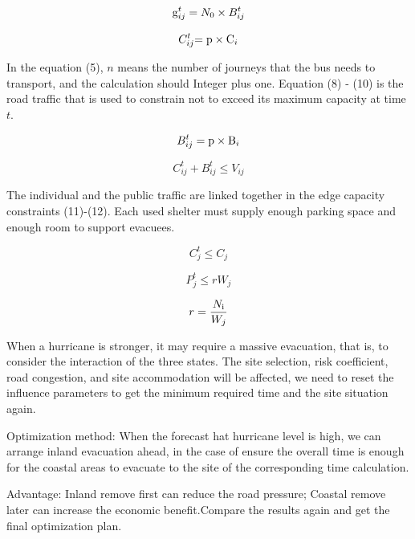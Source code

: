 \documentclass{mcmthesis}
\begin{document}
\begin{equation}\label{9}
  {\rm{g}}_{ij}^t = {N_0} \times B_{ij}^t
\end{equation}

\begin{equation}\label{10}
  C_{ij}^t{\rm{ = p}} \times {{\rm{C}}_i}
\end{equation}

In the equation (5), $n$ means the number of journeys that the bus needs to transport, and the calculation should Integer plus one. Equation (8) - (10) is the road traffic that is used to constrain not to exceed its maximum capacity at time $t$.

\begin{equation}\label{11}
  B_{ij}^t = {\rm{p}} \times {{\rm{B}}_i}
\end{equation}

\begin{equation}\label{12}
  C_{ij}^t + B_{ij}^t \le {V_{ij}}
\end{equation}

The individual and the public traffic are linked together in the edge capacity constraints (11)-(12). Each used shelter must supply enough parking space and enough room to support evacuees.

\begin{equation}\label{13}
  C_j^t \le {C_j}
\end{equation}

\begin{equation}\label{14}
  P_j^t \le r{W_j}
\end{equation}

\begin{equation}\label{15}
  r = \frac{{{N_{\rm{i}}}}}{{{W_j}}}
\end{equation}

When a hurricane is stronger, it may require a massive evacuation, that is, to consider the interaction of the three states. The site selection, risk coefficient, road congestion, and site accommodation will be affected, we need to reset the influence parameters to get the minimum required time and the site situation again.

Optimization method: When the forecast hat hurricane level is high, we can arrange inland evacuation ahead, in the case of ensure the overall time is enough for the coastal areas to evacuate to the site of the corresponding time calculation.

Advantage: Inland remove first can reduce the road pressure; Coastal remove later can increase the economic benefit.Compare the results again and get the final optimization plan.
\end{document}
